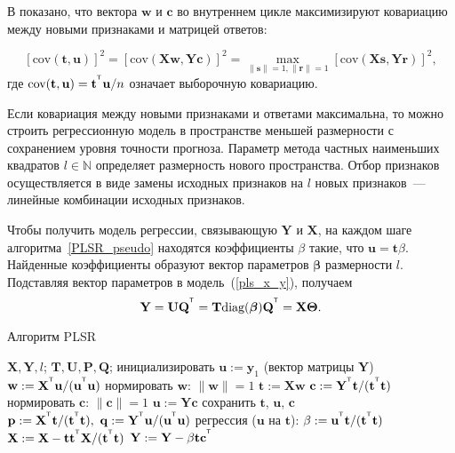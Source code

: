 \documentclass[12pt,twoside]{article}
\newcommand{\by}{\mathbf{y}}
\newcommand{\bw}{\mathbf{w}}
\newcommand{\bY}{\mathbf{Y}}
\newcommand{\bX}{\mathbf{X}}
\newcommand{\bu}{\mathbf{u}}
\newcommand{\bt}{\mathbf{t}}
\newcommand{\bp}{\mathbf{p}}
\newcommand{\bq}{\mathbf{q}}
\newcommand{\br}{\mathbf{r}}
\newcommand{\bc}{\mathbf{c}}
\newcommand{\bs}{\mathbf{s}}
\newcommand{\bP}{\mathbf{P}}
\newcommand{\bT}{\mathbf{T}}
\newcommand{\bQ}{\mathbf{Q}}
\newcommand{\bU}{\mathbf{U}}
\newcommand{\bTheta}{\boldsymbol{\Theta}}
\begin{document}
В \cite{ng2013simple} показано, что вектора 
$\bw$ и $\bc$ во внутреннем цикле максимизируют ковариацию между новыми признаками и матрицей ответов:

$$
        [\text{cov} (\bt, \bu)]^2 = [\text{cov} (\bX \bw, \bY \bc)]^2 = \max\limits_{\|\bs\|=1, \|\br\|=1} [\text{cov} (\bX \bs, \bY \br)]^2, 
$$
где $\text{cov} (\bt, \bu) = \bt^{\T} \bu / n$ означает выборочную ковариацию.

Если ковариация между новыми признаками и ответами максимальна, то можно строить регрессионную модель в пространстве меньшей размерности с сохранением уровня точности прогноза. Параметр метода частных наименьших квадратов $l \in \mathbb{N}$ определяет размерность нового пространства. Отбор признаков осуществляется в виде замены исходных признаков на $l$ новых признаков~--- линейные комбинации исходных признаков.


Чтобы получить модель регрессии, связывающую $\bY$ и $\bX$, на каждом шаге алгоритма~\ref{PLSR_pseudo} находятся коэффициенты $\beta$ такие, что $\bu = \bt \beta$. Найденные коэффициенты образуют вектор параметров $\boldsymbol{\beta}$ размерности $l$. 
Подставляя вектор параметров в модель~(\ref{pls_x_y}), получаем
$$
    \bY = \bU\bQ^{\T} = \bT \text{diag}(\boldsymbol{\beta}) \bQ^{\T} = \bX \bTheta.
$$

\begin{center}
\begin{algorithm}[h]
\caption{Алгоритм PLSR}
    \label{PLSR_pseudo}
\begin{algorithmic}[1]
\REQUIRE $\bX, \bY, l$;
\ENSURE $\bT, \bU, \bP, \bQ$;
\STATE инициализировать $\bu := \by_1$ (вектор матрицы $\bY$)
  \REPEAT
    \STATE $\bw := \bX^{\T} \bu / (\bu^{\T} \bu)$
    \STATE нормировать $\bw$: $\| \bw \| = 1$
    \STATE $\mathbf{t} := \bX \bw$
    \STATE $\bc := \bY^{\T} \bt / (\bt^{\T} \bt)$
    \STATE нормировать $\bc$:  $\| \bc \| = 1$
    \STATE $\bu := \bY \bc$
  \UNTIL{$\bt$ не перестанет меняться}
  \STATE сохранить $\bt$, $\bu$, $\bc$
  \STATE $\bp := \bX^{\T}\bt/(\bt^{\T}\bt),\ \bq := \bY^{\T}\bu/(\bu^{\T}\bu)$
  \STATE регрессия ($\bu$ на $\bt$): $\beta := \bu^{\T} \bt / (\bt^{\T} \bt)$ 
  \STATE $\bX := \bX - \bt\bt^{\T}\bX/(\bt^{\T}\bt)$
  \STATE $\bY := \bY - \beta\bt\bc^{\T}$ 
\ENDFOR
\end{algorithmic}
\end{algorithm}
\end{center}
\end{document}
